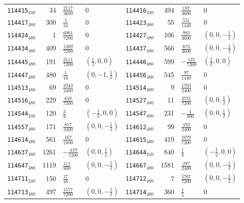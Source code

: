 {\begin{longtable}{@{}lrll@{\hspace{2em}}lrll@{}}
\texttt{114415}$_{240}$ & 34 & $\tfrac{2117}{3600}$ & 0 & \texttt{114416}$_{240}$ & 494 & $\tfrac{187}{3600}$ & 0\\
\texttt{114417}$_{480}$ & 300 & $\tfrac{5}{24}$ & 0 & \texttt{114423}$_{480}$ & 55 & $\tfrac{551}{1440}$ & 0\\
\texttt{114424}$_{480}$ & 1 & $\tfrac{6061}{7200}$ & 0 & \texttt{114427}$_{480}$ & 106 & $\tfrac{983}{3600}$ & $(0,0,-\tfrac{1}{2})$\\
\texttt{114434}$_{480}$ & 409 & $\tfrac{1309}{7200}$ & 0 & \texttt{114437}$_{480}$ & 566 & $\tfrac{673}{3600}$ & $(0,0,-\tfrac{1}{2})$\\
\texttt{114445}$_{480}$ & 191 & $\tfrac{2111}{7200}$ & $(\tfrac{1}{2},0,0)$ & \texttt{114446}$_{480}$ & 599 & $-\tfrac{121}{7200}$ & $(\tfrac{1}{2},0,0)$\\
\texttt{114447}$_{480}$ & 480 & $\tfrac{1}{10}$ & $(0,-1,\tfrac{1}{2})$ & \texttt{114456}$_{480}$ & 545 & $\tfrac{97}{1440}$ & 0\\
\texttt{114513}$_{480}$ & 69 & $\tfrac{1043}{2400}$ & 0 & \texttt{114514}$_{480}$ & 9 & $\tfrac{1703}{2400}$ & 0\\
\texttt{114516}$_{480}$ & 229 & $\tfrac{649}{7200}$ & 0 & \texttt{114527}$_{480}$ & 11 & $\tfrac{3731}{7200}$ & $(0,0,\tfrac{1}{2})$\\
\texttt{114544}$_{240}$ & 120 & $\tfrac{3}{8}$ & $(-\tfrac{1}{2},0,0)$ & \texttt{114547}$_{480}$ & 231 & $-\tfrac{1}{800}$ & $(0,0,\tfrac{1}{2})$\\
\texttt{114557}$_{480}$ & 171 & $\tfrac{817}{2400}$ & $(0,0,-\tfrac{1}{2})$ & \texttt{114612}$_{480}$ & 99 & $\tfrac{493}{2400}$ & 0\\
\texttt{114614}$_{480}$ & 561 & $\tfrac{167}{2400}$ & 0 & \texttt{114615}$_{480}$ & 419 & $\tfrac{1079}{7200}$ & 0\\
\texttt{114637}$_{480}$ & 1261 & $-\tfrac{419}{7200}$ & $(0,0,\tfrac{1}{2})$ & \texttt{114644}$_{240}$ & 840 & $\tfrac{1}{8}$ & $(-\tfrac{1}{2},0,0)$\\
\texttt{114647}$_{480}$ & 1119 & $\tfrac{111}{800}$ & $(0,0,-\tfrac{1}{2})$ & \texttt{114667}$_{480}$ & 1581 & $\tfrac{287}{2400}$ & $(0,0,-\tfrac{1}{2})$\\
\texttt{114711}$_{240}$ & 150 & $\tfrac{17}{48}$ & 0 & \texttt{114712}$_{480}$ & 7 & $\tfrac{5767}{7200}$ & $(0,0,-\tfrac{1}{2})$\\
\texttt{114713}$_{480}$ & 497 & $\tfrac{1577}{7200}$ & $(0,0,-\tfrac{1}{2})$ & \texttt{114714}$_{480}$ & 360 & $\tfrac{1}{5}$ & 0\\

\end{longtable}}
